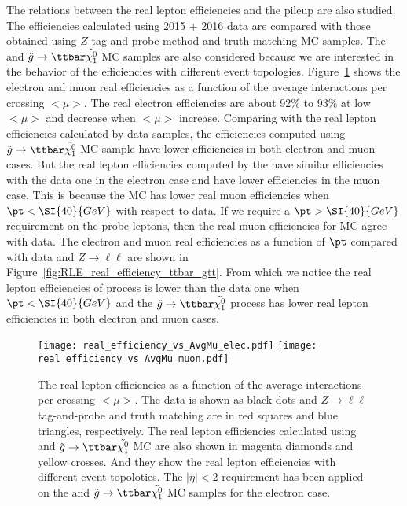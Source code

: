 The relations between the real lepton efficiencies and the pileup are also studied.
The efficiencies calculated using 2015 + 2016 data are compared with those obtained using $Z$ tag-and-probe method and truth matching MC samples.
The \ttbar and $\tilde{g}\to\ttbar\tilde{\chi^{0}_{1}}$ MC samples are also considered because we are interested in the behavior of the efficiencies with different event topologies.
Figure~\ref{fig:RLE_vs_pileup} shows the electron and muon real efficiencies as a function of the average interactions per crossing $<\mu>$.
The real electron efficiencies are about 92\% to 93\% at low $<\mu>$ and decrease when $<\mu>$ increase.
Comparing with the real lepton efficiencies calculated by data samples, the efficiencies computed using $\tilde{g}\to\ttbar\tilde{\chi^{0}_{1}}$ MC sample have lower efficiencies in both electron and muon cases.
But the real lepton efficiencies computed by the \ttbar have similar efficiencies with the data one in the electron case and have lower efficiencies in the muon case.
This is because the \ttbar MC has lower real muon efficiencies when $\pt<\SI{40}{GeV}$ with respect to data.
If we require a $\pt>\SI{40}{GeV}$ requirement on the probe leptons, then the real muon efficiencies for \ttbar MC agree with data.
The electron and muon real efficiencies as a function of $\pt$ compared with data and $Z\to\ell\ell$ are shown in Figure~\ref{fig:RLE_real_efficiency_ttbar_gtt}.
From which we notice the real lepton efficiencies of \ttbar process is lower than the data one when $\pt<\SI{40}{GeV}$ and the $\tilde{g}\to\ttbar\tilde{\chi^{0}_{1}}$ process has lower real lepton efficiencies in both electron and muon cases.

\begin{figure}[htbp]
\texttt{[image: real\_efficiency\_vs\_AvgMu\_elec.pdf]}
\texttt{[image: real\_efficiency\_vs\_AvgMu\_muon.pdf]}
\caption{
The real lepton efficiencies as a function of the average interactions per crossing $<\mu>$.
The data is shown as black dots and $Z\to \ell\ell$ tag-and-probe and truth matching are in red squares and blue triangles, respectively.
The real lepton efficiencies calculated using \ttbar and $\tilde{g}\to\ttbar\tilde{\chi^{0}_{1}}$ MC are also shown in magenta diamonds and yellow crosses.
And they show the real lepton efficiencies with different event topoloties.
The $|\eta|<2$ requirement has been applied on the \ttbar and $\tilde{g}\to\ttbar\tilde{\chi^{0}_{1}}$ MC samples for the electron case.
}
\label{fig:RLE_vs_pileup}
\end{figure}

